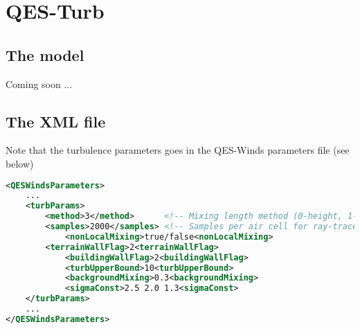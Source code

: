 \chapter{QES-Turb}



\section{The model}

Coming soon ...

\section{The XML file}

Note that the turbulence parameters goes in the QES-Winds parameters file (see below)
\begin{lstlisting}[language=XML]
<QESWindsParameters>
	...
	<turbParams>
		<method>3</method>      <!-- Mixing length method (0-height, 1-serial, 2-raytracing, 3-OptiX, 4-file) -->
  		<samples>2000</samples> <!-- Samples per air cell for ray-traced mixing length calculations -->
    		<nonLocalMixing>true/false<nonLocalMixing>
   		<terrainWallFlag>2<terrainWallFlag>
    		<buildingWallFlag>2<buildingWallFlag>
    		<turbUpperBound>10<turbUpperBound>
    		<backgroundMixing>0.3<backgroundMixing>
    		<sigmaConst>2.5 2.0 1.3<sigmaConst>
	</turbParams>							
	...
</QESWindsParameters>
\end{lstlisting}
